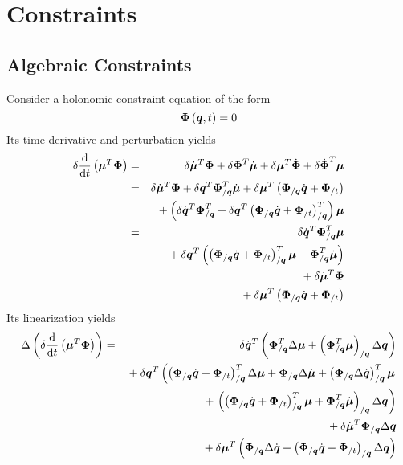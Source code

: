 \documentclass[10pt,dvips,fleqn]{report}
\newcommand{\T}[1]{\boldsymbol{#1}}
\begin{document}
\chapter{Constraints}

\section{Algebraic Constraints}
Consider a holonomic constraint equation of the form
\begin{equation}
	\T{\Phi}\plbr{\T{q}, t} = 0 
\end{equation}
Its time derivative and perturbation yields
\begin{eqnarray*}
	\delta\frac{\llk{d}}{\llk{d}t}\plbr{\T{\mu}^T\T{\Phi}} & = &
		\delta\dot{\T{\mu}}^T \T{\Phi}
		+ \delta\T{\Phi}^T \dot{\T{\mu}}
		+ \delta\T{\mu}^T \dot{\T{\Phi}}
		+ \delta\dot{\T{\Phi}}^T \T{\mu} \\
	& = & \delta\dot{\T{\mu}}^T \T{\Phi}
		+ \delta\T{q}^T \T{\Phi}_{/\T{q}}^T \dot{\T{\mu}}
		+ \delta\T{\mu}^T\plbr{
			\T{\Phi}_{/\T{q}} \dot{\T{q}}
			+ \T{\Phi}_{/t}
		} \\
	& & \mbox{} + \plbr{
			\delta\dot{\T{q}}^T \T{\Phi}_{/\T{q}}^T
			+ \delta\T{q}^T \plbr{
				\T{\Phi}_{/\T{q}} \dot{\T{q}}
				+ \T{\Phi}_{/t}
			}_{/\T{q}}^T
		} \T{\mu} \\
	& = & \delta\dot{\T{q}}^T \T{\Phi}_{/\T{q}}^T \T{\mu} \\
	& & \mbox{} + \delta\T{q}^T \plbr{
		\plbr{
			\T{\Phi}_{/\T{q}} \dot{\T{q}}
			+ \T{\Phi}_{/t}
		}_{/\T{q}}^T \T{\mu}
		+ \T{\Phi}_{/\T{q}}^T \dot{\T{\mu}}
	} \\
	& & \mbox{} + \delta\dot{\T{\mu}}^T \T{\Phi} \\
	& & \mbox{} + \delta\T{\mu}^T \plbr{
		\T{\Phi}_{/\T{q}} \dot{\T{q}}
		+ \T{\Phi}_{/t}
	}
\end{eqnarray*}
Its linearization yields
\begin{eqnarray*}
	\Delta\plbr{\delta\frac{\llk{d}}{\llk{d}t}\plbr{\T{\mu}^T\T{\Phi}}}
	& = & \delta\dot{\T{q}}^T \plbr{
		\T{\Phi}_{/\T{q}}^T \Delta\T{\mu}
		+ \plbr{\T{\Phi}_{/\T{q}}^T \T{\mu}}_{/\T{q}} \Delta\T{q}
	} \\
	& & \mbox{} + \delta\T{q}^T \lplbr{
		\plbr{
			\T{\Phi}_{/\T{q}} \dot{\T{q}}
			+ \T{\Phi}_{/t}
		}_{/\T{q}}^T \Delta \T{\mu}
		+ \T{\Phi}_{/\T{q}} \Delta\dot{\T{\mu}}
		+ \plbr{\T{\Phi}_{/\T{q}} \Delta\dot{\T{q}}}_{/\T{q}}^T \T{\mu}
	} \\
	& & \mbox{\hspace{12mm}} + \rplbr{
		\plbr{
			\plbr{
				\T{\Phi}_{/\T{q}} \dot{\T{q}}
				+ \T{\Phi}_{/t}
			}_{/\T{q}}^T \T{\mu}
			+ \T{\Phi}_{/\T{q}}^T \dot{\T{\mu}}
		}_{/\T{q}} \Delta\T{q}
	} \\
	& & \mbox{} + \delta\dot{\T{\mu}}^T \T{\Phi}_{/\T{q}} \Delta\T{q} \\
	& & \mbox{} + \delta\T{\mu}^T \plbr{
		\T{\Phi}_{/\T{q}} \Delta\dot{\T{q}}
		+ \plbr{
			\T{\Phi}_{/\T{q}} \dot{\T{q}}
			+ \T{\Phi}_{/t}
		}_{/\T{q}} \Delta\T{q}
	}
\end{eqnarray*}
\end{document}
